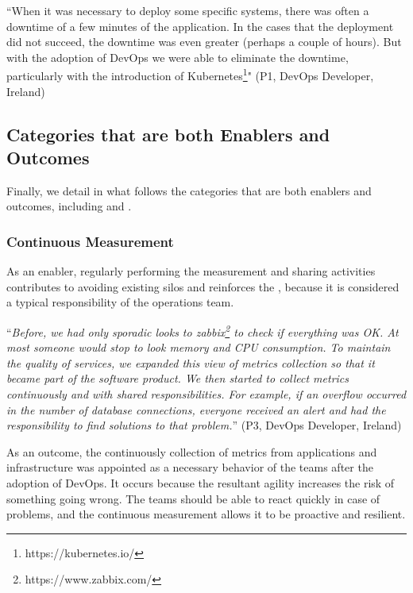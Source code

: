 \begin{mq}
``When it was necessary to deploy some specific systems, 
  there was often a downtime of a few minutes of the
  application. In the cases that the deployment did not
  succeed, the downtime was even greater (perhaps a couple
  of hours). But with the adoption of DevOps we were able
  to eliminate the downtime, particularly with the introduction
  of Kubernetes\footnote{https://kubernetes.io/}"
  (P1, DevOps Developer, Ireland)
\end{mq}

\subsection{Categories that are both Enablers and Outcomes}

Finally, we detail in what follows the categories that are both enablers
and outcomes, including 
and .

\subsubsection{Continuous Measurement}

As an enabler, regularly performing the measurement and sharing activities
contributes to avoiding existing silos and reinforces the \cc, because it is
considered a typical responsibility of the operations team.

\begin{mq}
``\emph{Before, we had only sporadic looks to
zabbix\footnote{https://www.zabbix.com/} to check if everything was OK.
At most someone would stop to look memory and CPU consumption. To maintain
the quality of services, we expanded this view of metrics collection so that it
became part of the software product. We then started to collect metrics continuously
and with shared responsibilities. For example, if an overflow occurred in the
number of database connections, everyone received an alert and had
the responsibility to find solutions to that problem.}'' (P3, DevOps Developer, Ireland)
\end{mq}

As an outcome, the continuously collection of metrics from applications and
infrastructure was appointed as a necessary behavior of the teams after the adoption
of DevOps. It occurs because the resultant agility increases the risk of
something going wrong. The teams should be able to react quickly in case of
problems, and the continuous measurement allows it to be proactive and resilient.

